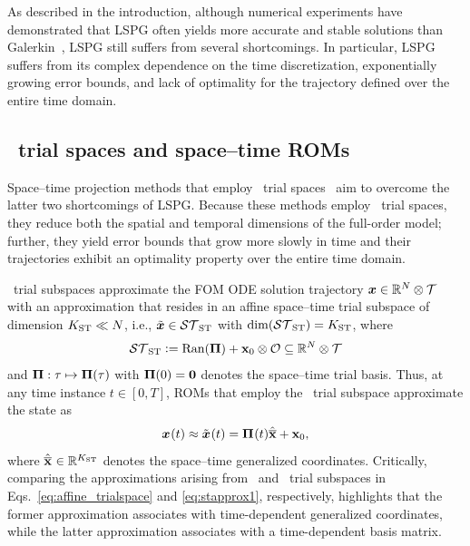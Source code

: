 \documentclass[3p,computermodern,10pt]{elsarticle}
\begin{document}
As described in the introduction, although numerical experiments have
demonstrated that LSPG often yields more accurate and stable
solutions than Galerkin~\cite{bui_thesis,carlberg_lspg_v_galerkin,carlberg_gnat,carlberg_thesis,parish_apg},
LSPG still suffers from several shortcomings. In particular, LSPG suffers from its complex
dependence on the time discretization, exponentially growing error bounds, and
lack of optimality for the trajectory defined over the entire time domain.

\subsection{\spaceTimeAcronym\ trial spaces and space--time ROMs}

Space--time projection methods that employ \spaceTimeAcronym\ trial
spaces~\cite{choi_stlspg,constantine_strom,URBAN2012203,Yano2014ASC,benner_st,bui_thesis}
aim to overcome the latter two shortcomings of LSPG. Because these methods employ \spaceTimeAcronym\ trial
spaces, they reduce both the spatial and temporal dimensions of the full-order
model; further, they yield error bounds that grow more slowly in time and
their trajectories exhibit an optimality property over the entire time domain. 

\spaceTimeAcronym\ trial subspaces approximate the FOM ODE solution
trajectory
	${\boldsymbol x}\in\mathbb{R}^{N}\otimes \mathcal{T}$ with an approximation that resides in an
	affine space--time trial subspace of dimension $K_{\text{ST}}\ll N$, i.e., 
	$\tilde{\boldsymbol x}\in \mathcal{ ST }_{\text{ST}}$ with $\dim(\mathcal{ ST }_{\text{ST}}) =K_{\text{ST}} $, where
\begin{equation}\label{eq:sttrialspace_def}
 \mathcal{ ST }_{\text{ST}} \vcentcolon= 
	\mathrm{Ran}(\boldsymbol \Pi) + 
	{{\mathbf{x}}_0}\otimes\mathcal{O}
	\subseteq \mathbb{R}^{N} \otimes \mathcal{T}
\end{equation}
and $\boldsymbol \Pi:\tau\mapsto\boldsymbol \Pi(\tau)$ with $\boldsymbol \Pi(0) =
\boldsymbol 0$
denotes the space--time trial basis. 
Thus, at any time instance $t\in[0,T]$, ROMs that employ the
\spaceTimeAcronym\ trial subspace approximate the state as
\begin{equation}\label{eq:stapprox1}
 {\boldsymbol x}^{}(t) \approx \tilde{\boldsymbol x}^{}(t)  = \boldsymbol \Pi^{}(t) \hat{\mathbf{\overline{x}}} + {{\mathbf{x}}_0},
\end{equation}
where $\hat{\mathbf{\overline{x}}}^{} \in \mathbb{R}^{K_{\text{ST}}}$ denotes the space--time generalized coordinates. 
Critically, comparing the approximations arising from \spatialAcronym\ and
\spaceTimeAcronym\ trial subspaces in Eqs.~\eqref{eq:affine_trialspace} and \eqref{eq:stapprox1}, respectively,
highlights that the former approximation associates with time-dependent
generalized coordinates, while the latter approximation associates with a
time-dependent basis matrix.
\end{document}
